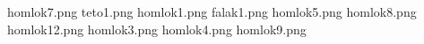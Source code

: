 homlok7.png
teto1.png
homlok1.png
falak1.png
homlok5.png
homlok8.png
homlok12.png
homlok3.png
homlok4.png
homlok9.png
